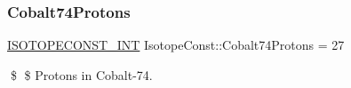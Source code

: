 \subsubsection{\texorpdfstring{Cobalt74\+Protons}{Cobalt74Protons}}
{\footnotesize\ttfamily \mbox{\hyperlink{group___isotope_const-_macros_ga5f18360b3e99483a35c32d789e62621c}{I\+S\+O\+T\+O\+P\+E\+C\+O\+N\+S\+T\+\_\+\+I\+NT}} Isotope\+Const\+::\+Cobalt74\+Protons = 27}

\$ \$ Protons in Cobalt-\/74. 